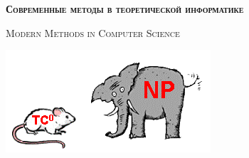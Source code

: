 


\thispagestyle{empty}

\centerline{\large \textsc{\textbf{Современные методы в теоретической информатике}}}
\centerline{\textsc{Modern Methods in Computer Science}}

\bigskip



\vspace{1cm}

\begin{center}
    \includegraphics[scale = 0.5]{pics/zoo.png}
\end{center}

\vspace{1cm}


\nocite{*}



